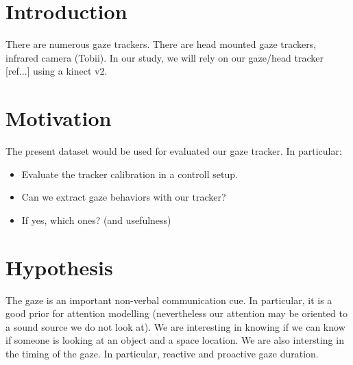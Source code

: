 \documentclass[11pt,a4paper]{article}
\begin{document}
\section{Introduction}
There are numerous gaze trackers. There are head mounted gaze trackers, infrared camera (Tobii). 
\newline
In our study, we will rely on our gaze/head tracker [ref...] using a kinect v2. 

\section{Motivation}
The present dataset would be used for evaluated our gaze tracker. In particular:
\begin{itemize}
\item Evaluate the tracker calibration in a controll setup.
\item Can we extract gaze behaviors with our tracker?
\item If yes, which ones? (and usefulness)
\end{itemize}

\section{Hypothesis}
The gaze is an important non-verbal communication cue. In particular, it is a good prior for attention modelling (nevertheless our attention may be oriented to a sound source we do not look at). We are interesting in knowing if we can know if someone is looking at an object and a space location. We are also intersting in the timing of the gaze. In particular, reactive and proactive gaze duration.
\end{document}
